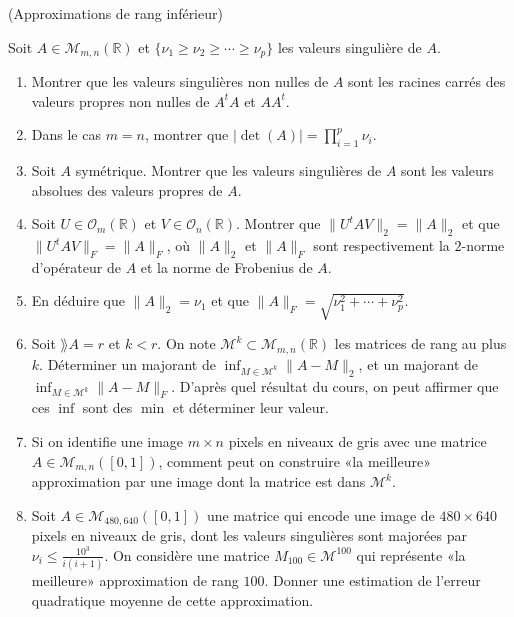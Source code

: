 \documentclass[a4paper,12pt,reqno]{amsart}
\begin{document}
\begin{exo} (Approximations de rang inférieur)

Soit $A \in \mathcal{M}_{m,n}(\mathbb{R})$ et $\{ \nu_{1} \geq \nu_{2} \geq \cdots \geq \nu_{p}\}$ les valeurs singulière de $A$.

    \begin{enumerate}

        \item Montrer que les valeurs singulières non nulles de $A$ sont les racines carrés des valeurs propres non nulles de $A^{t}A$ et $AA^{t}$.

        \item Dans le cas $m=n$, montrer que $ |\det(A)| = \prod_{i=1}^{p} \nu_{i}$.

        \item Soit $A$ symétrique. Montrer que les valeurs singulières de $A$ sont les valeurs absolues des valeurs propres de $A$.

        \item Soit $U \in \mathcal{O}_{m}(\mathbb{R})$ et $V \in \mathcal{O}_{n}(\mathbb{R})$. Montrer que $\| U^{t} A  V\|_{2} = \| A \|_{2}$ et que $\| U^{t} A  V\|_{F} = \| A \|_{F}$, où $\| A \|_{2}$ et $\| A \|_{F}$ sont respectivement la $2$-norme d'opérateur de $A$ et la norme de Frobenius de $A$.

        \item En déduire que $\| A \|_{2} = \nu_{1}$ et que $\| A \|_{F} = \sqrt{\nu_{1}^{2}+\cdots+\nu_{p}^{2}}$.

        \item Soit $\rang A = r$ et $k < r$. On note $\mathcal{M}^{k} \subset \mathcal{M}_{m,n}(\mathbb{R})$ les matrices de rang au plus $k$.  Déterminer un majorant de $\inf_{M \in \mathcal{M}^{k}}\| A - M\|_{2}$, et un majorant de $\inf_{M \in \mathcal{M}^{k}}\| A - M\|_{F}$. D'après quel résultat du cours, on peut affirmer que ces $\inf$ sont des $\min$ et déterminer leur valeur.

        \item Si on identifie une image $m \times n$ pixels en niveaux de gris avec une matrice $A \in \mathcal{M}_{m,n}([0,1])$, comment peut on construire «la meilleure» approximation par une image dont la matrice est dans $\mathcal{M}^{k}$.

        \item Soit $A \in \mathcal{M}_{480,640}([0,1])$ une matrice qui encode une image de $480 \times 640$ pixels en niveaux de gris, dont les valeurs singulières sont majorées par $\nu_{i} \leq \frac{10^{3}}{i(i+1)}$. On considère une matrice $M_{100} \in \mathcal{M}^{100}$ qui représente «la meilleure» approximation de rang $100$. Donner une estimation de l'erreur quadratique moyenne de cette approximation.
    \end{enumerate}
\end{exo}
\end{document}

